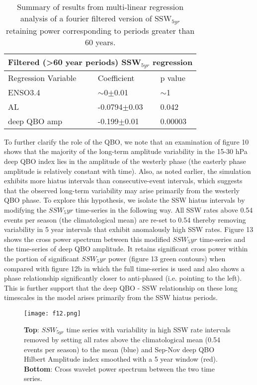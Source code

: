 \documentclass[wcd, manuscript]{copernicus}
\begin{document}
\begin{table}
\centering
\begin{tabular}{|p{3cm}||p{3cm}|p{3cm}|}
 \hline
 \multicolumn{3}{|c|}{Filtered (>60 year periods) SSW$_{5yr}$ regression}\\
 \hline
 Regression Variable& Coefficient& p value\\
 \hline
 ENSO3.4  &   $\sim$0$\pm$0.01  & $\sim$1\\
 AL & -0.0794$\pm$0.03& 0.042\\
 deep QBO amp &-0.199$\pm$0.01&0.00003\\
 \hline
\end{tabular}
\begin{center}
\caption{Summary of results from multi-linear regression analysis of a fourier filtered  version of SSW$_{5yr}$ retaining power corresponding to periods greater than 60 years.}  
\end{center}
\end{table}


To further clarify the role of the QBO, we note that an examination of figure 10 shows that the majority of the long-term amplitude variability in the 15-30 hPa deep QBO index lies in the amplitude of the westerly phase (the easterly phase amplitude is relatively constant with time). Also, as noted earlier, the simulation exhibits more hiatus intervals than consecutive-event intervals, which suggests that the observed long-term variability may arise primarily from the westerly QBO phase. To explore this hypothesis, we isolate the SSW  hiatus intervals by modifying the $SSW_5yr$ time-series in the following way. All SSW rates above 0.54 events per season (the climatological mean) are re-set to 0.54 thereby removing variability in 5 year intervals that exhibit anomalously high SSW rates. Figure 13 shows the cross power spectrum between this modified $SSW_5yr$ time-series and the time-series of deep QBO amplitude. It retains significant cross power within the portion of significant $SSW_5yr$ power (figure 13 green contours) when compared with figure 12b in which the full time-series is used and also shows a phase relationship significantly closer to anti-phased (i.e. pointing to the left). This is further support that the deep QBO - SSW relationship  on these long timescales in the model arises primarily from the SSW hiatus periods. 


\begin{center}
\begin{figure}[h!]
\texttt{[image: f12.png]}
\caption{\textbf{Top}: $SSW_{5yr}$ time series with variability in high SSW rate intervals removed by setting all rates above the climatological mean (0.54 events per season) to the mean (blue) and Sep-Nov deep QBO Hilbert Amplitude index smoothed with a 5 year window (red). \textbf{Bottom}: Cross wavelet power spectrum between the two time series.}
\label{fig1}
\end{figure}
\end{center}
\end{document}
